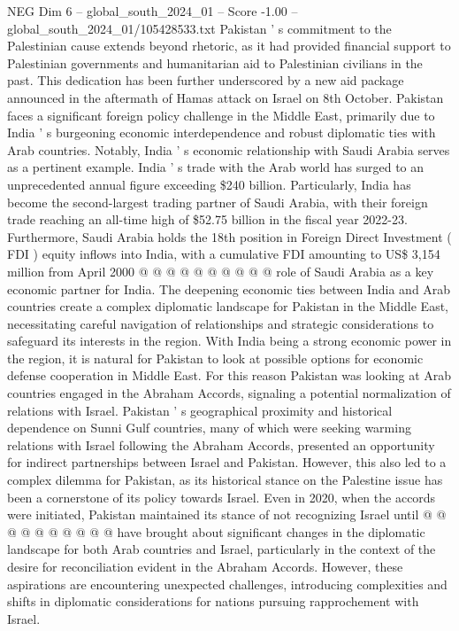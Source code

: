 \begin{textsample}{NEG Dim 6 – global\_south\_2024\_01 – Score -1.00 – global\_south\_2024\_01/105428533.txt}
Pakistan ' s commitment to the Palestinian cause extends beyond rhetoric, as it had provided financial support to Palestinian governments and humanitarian aid to Palestinian civilians in the past.
This dedication has been further underscored by a new aid package announced in the aftermath of Hamas attack on Israel on 8th October.
Pakistan faces a significant foreign policy challenge in the Middle East, primarily due to India ' s burgeoning economic interdependence and robust diplomatic ties with Arab countries.
Notably, India ' s economic relationship with Saudi Arabia serves as a pertinent example.
India ' s trade with the Arab world has surged to an unprecedented annual figure exceeding \$240 billion.
Particularly, India has become the second-largest trading partner of Saudi Arabia, with their foreign trade reaching an all-time high of \$52.75 billion in the fiscal year 2022-23.
Furthermore, Saudi Arabia holds the 18th position in Foreign Direct Investment ( FDI ) equity inflows into India, with a cumulative FDI amounting to US\$ 3,154 million from April 2000 @ @ @ @ @ @ @ @ @ @ role of Saudi Arabia as a key economic partner for India.
The deepening economic ties between India and Arab countries create a complex diplomatic landscape for Pakistan in the Middle East, necessitating careful navigation of relationships and strategic considerations to safeguard its interests in the region.
With India being a strong economic power in the region, it is natural for Pakistan to look at possible options for economic defense cooperation in Middle East.
For this reason Pakistan was looking at Arab countries engaged in the Abraham Accords, signaling a potential normalization of relations with Israel.
Pakistan ' s geographical proximity and historical dependence on Sunni Gulf countries, many of which were seeking warming relations with Israel following the Abraham Accords, presented an opportunity for indirect partnerships between Israel and Pakistan.
However, this also led to a complex dilemma for Pakistan, as its historical stance on the Palestine issue has been a cornerstone of its policy towards Israel.
Even in 2020, when the accords were initiated, Pakistan maintained its stance of not recognizing Israel until @ @ @ @ @ @ @ @ @ @ have brought about significant changes in the diplomatic landscape for both Arab countries and Israel, particularly in the context of the desire for reconciliation evident in the Abraham Accords.
However, these aspirations are encountering unexpected challenges, introducing complexities and shifts in diplomatic considerations for nations pursuing rapprochement with Israel.

\end{textsample}
